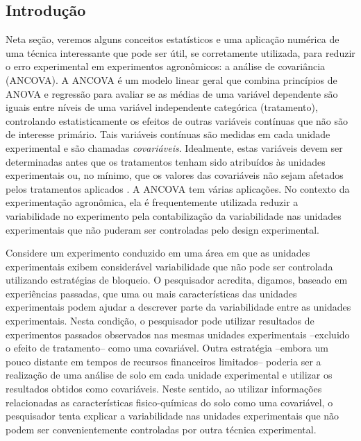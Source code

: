 \documentclass[
]{book}
\begin{document}
\hypertarget{introduuxe7uxe3o}{%
\subsection{Introdução}\label{introduuxe7uxe3o}}

Neta seção, veremos alguns conceitos estatísticos e uma aplicação numérica de uma técnica interessante que pode ser útil, se corretamente utilizada, para reduzir o erro experimental em experimentos agronômicos: a análise de covariância (ANCOVA). A ANCOVA é um modelo linear geral que combina princípios de ANOVA e regressão para avaliar se as médias de uma variável dependente são iguais entre níveis de uma variável independente categórica (tratamento), controlando estatisticamente os efeitos de outras variáveis contínuas que não são de interesse primário. Tais variáveis contínuas são medidas em cada unidade experimental e são chamadas \emph{covariáveis}. Idealmente, estas variáveis devem ser determinadas antes que os tratamentos tenham sido atribuídos às unidades experimentais ou, no mínimo, que os valores das covariáveis não sejam afetados pelos tratamentos aplicados \citep{Snedecor1967}. A ANCOVA tem várias aplicações. No contexto da experimentação agronômica, ela é frequentemente utilizada reduzir a variabilidade no experimento pela contabilização da variabilidade nas unidades experimentais que não puderam ser controladas pelo design experimental.

Considere um experimento conduzido em uma área em que as unidades experimentais exibem considerável variabilidade que não pode ser controlada utilizando estratégias de bloqueio. O pesquisador acredita, digamos, baseado em experiências passadas, que uma ou mais características das unidades experimentais podem ajudar a descrever parte da variabilidade entre as unidades experimentais. Nesta condição, o pesquisador pode utilizar resultados de experimentos passados observados nas mesmas unidades experimentais --excluido o efeito de tratamento-- como uma covariável. Outra estratégia --embora um pouco distante em tempos de recursos financeiros limitados-- poderia ser a realização de uma análise de solo em cada unidade experimental e utilizar os resultados obtidos como covariáveis. Neste sentido, ao utilizar informações relacionadas as características fisico-químicas do solo como uma covariável, o pesquisador tenta explicar a variabilidade nas unidades experimentais que não podem ser convenientemente controladas por outra técnica experimental.
\end{document}
